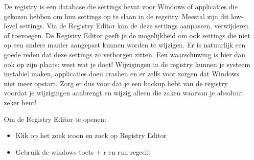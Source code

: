 De registry is een database die settings bevat voor Windows of applicaties die gekozen hebben om hun settings op te slaan in de regsitry. Meestal zijn dit low-level settings. Via de Registry Editor kan de deze settings aanpassen, verwijderen of toevoegen. De Registry Editor geeft je de mogelijkheid om ook settings die niet op een andere manier aangepast kunnen worden te wijzigen. Er is natuurlijk een goede reden dat deze settings zo verborgen zitten. Een waarschuwing is hier dan ook op zijn plaats: weet wat je doet! Wijzigingen in de registry kunnen je systeem instabiel maken, applicaties doen crashen en er zelfs voor zorgen dat Windows niet meer opstart. Zorg er dus voor dat je een backup hebt van de registry voordat je wijzigingen aanbrengt en wijzig alleen die zaken waarvan je absoluut zeker bent!

Om de Registry Editor te openen:
\begin{itemize}
\item Klik op het zoek icoon en zoek op Registry Editor
\item Gebruik de windows-toets + r en run regedit
\end{itemize}

\begin{minipage}[t]{\linewidth}
\raggedright
{}
\end{minipage}


